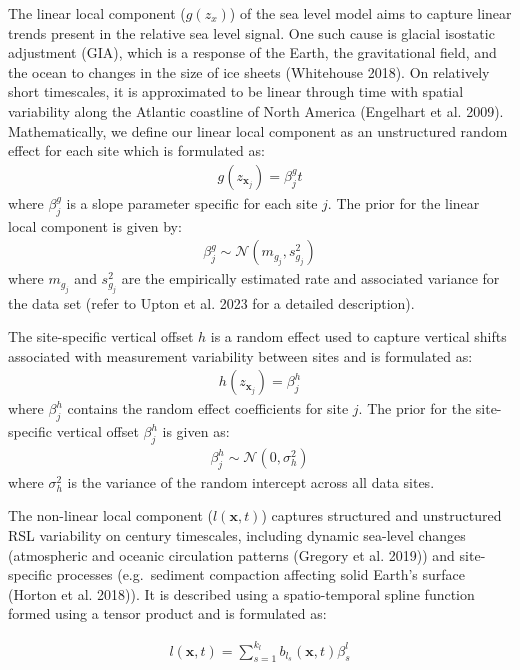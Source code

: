 The linear local component (\(g(z_x)\)) of the sea level model aims to capture linear trends present in the relative sea level signal. One such cause is glacial isostatic adjustment (GIA), which is a response of the Earth, the gravitational field, and the ocean to changes in the size of ice sheets (Whitehouse 2018). On relatively short timescales, it is approximated to be linear through time with spatial variability along the Atlantic coastline of North America (Engelhart et al. 2009). Mathematically, we define our linear local component as an unstructured random effect for each site which is formulated as:
\begin{align}
g(z_{\mathbf{x}_j}) = \beta^{g}_jt
\end{align}
where \(\beta^{g}_j\) is a slope parameter specific for each site \(j\). The prior for the linear local component is given by:
\begin{align}
\beta_j^g \sim \mathcal{N} (m_{g_j}, s^2_{g_j})
\end{align}
where \(m_{g_j}\) and \(s^2_{g_j}\) are the empirically estimated rate and associated variance for the data set (refer to Upton et al. 2023 for a detailed description).

The site-specific vertical offset \(h\) is a random effect used to capture vertical shifts associated with measurement variability between sites and is formulated as:
\begin{align}
h(z_{\mathbf{x}_j}) = \beta^{h}_j
 \end{align}
where \(\beta^{h}_j\) contains the random effect coefficients for site \(j\). The prior for the site-specific vertical offset \(\beta^{h}_j\) is given as:
\begin{align}
\beta^{h}_j \sim \mathcal{N}(0, \sigma_h^2)
\end{align}
where \(\sigma_h^2\) is the variance of the random intercept across all data sites.

The non-linear local component (\(l(\mathbf{x}, t)\)) captures structured and unstructured RSL variability on century timescales, including dynamic sea-level changes (atmospheric and oceanic circulation patterns (Gregory et al. 2019)) and site-specific processes (e.g.~sediment compaction affecting solid Earth's surface (Horton et al. 2018)). It is described using a spatio-temporal spline function formed using a tensor product and is formulated as:

\begin{align}
  l(\mathbf{x}, t) = \sum_{s=1}^{k_l} b_{l_s}(\mathbf{x},t) \beta^{l}_s
\end{align}

